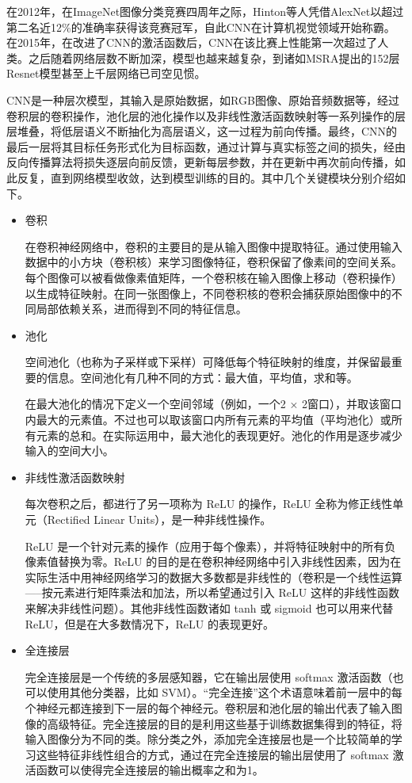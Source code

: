 在2012年，在ImageNet图像分类竞赛四周年之际，Hinton等人凭借AlexNet\cite{19krizhevsky2012imagenet}以超过第二名近12\%的准确率获得该竞赛冠军，自此CNN在计算机视觉领域开始称霸。在2015年，在改进了CNN的激活函数后，CNN在该比赛上性能第一次超过了人类。之后随着网络层数不断加深，模型也越来越复杂，到诸如MSRA提出的152层Resnet模型\cite{8he2016deep}甚至上千层网络已司空见惯。

CNN是一种层次模型，其输入是原始数据，如RGB图像、原始音频数据等，经过卷积层的卷积操作，池化层的池化操作以及非线性激活函数映射等一系列操作的层层堆叠，将低层语义不断抽化为高层语义，这一过程为前向传播。最终，CNN的最后一层将其目标任务形式化为目标函数，通过计算与真实标签之间的损失，经由反向传播算法将损失逐层向前反馈，更新每层参数，并在更新中再次前向传播，如此反复，直到网络模型收敛，达到模型训练的目的。其中几个关键模块分别介绍如下。
\begin{itemize}
	\item 卷积
	
	在卷积神经网络中，卷积的主要目的是从输入图像中提取特征。通过使用输入数据中的小方块（卷积核）来学习图像特征，卷积保留了像素间的空间关系。
每个图像可以被看做像素值矩阵，一个卷积核在输入图像上移动（卷积操作）以生成特征映射。在同一张图像上，不同卷积核的卷积会捕获原始图像中的不同局部依赖关系，进而得到不同的特征信息。

	\item 池化
	
	空间池化（也称为子采样或下采样）可降低每个特征映射的维度，并保留最重要的信息。空间池化有几种不同的方式：最大值，平均值，求和等。
	
在最大池化的情况下定义一个空间邻域（例如，一个2 × 2窗口），并取该窗口内最大的元素值。不过也可以取该窗口内所有元素的平均值（平均池化）或所有元素的总和。在实际运用中，最大池化的表现更好。池化的作用是逐步减少输入的空间大小。

	\item 非线性激活函数映射
	
	每次卷积之后，都进行了另一项称为 ReLU 的操作，ReLU 全称为修正线性单元（Rectified Linear Units），是一种非线性操作。
	
ReLU 是一个针对元素的操作（应用于每个像素），并将特征映射中的所有负像素值替换为零。ReLU 的目的是在卷积神经网络中引入非线性因素，因为在实际生活中用神经网络学习的数据大多数都是非线性的（卷积是一个线性运算-----按元素进行矩阵乘法和加法，所以希望通过引入 ReLU 这样的非线性函数来解决非线性问题）。其他非线性函数诸如 tanh 或 sigmoid 也可以用来代替 ReLU，但是在大多数情况下，ReLU 的表现更好。

	\item 全连接层
	
	完全连接层是一个传统的多层感知器，它在输出层使用 softmax 激活函数（也可以使用其他分类器，比如 SVM）。“完全连接”这个术语意味着前一层中的每个神经元都连接到下一层的每个神经元。卷积层和池化层的输出代表了输入图像的高级特征。完全连接层的目的是利用这些基于训练数据集得到的特征，将输入图像分为不同的类。除分类之外，添加完全连接层也是一个比较简单的学习这些特征非线性组合的方式，通过在完全连接层的输出层使用了 softmax 激活函数可以使得完全连接层的输出概率之和为1。

\end{itemize}

